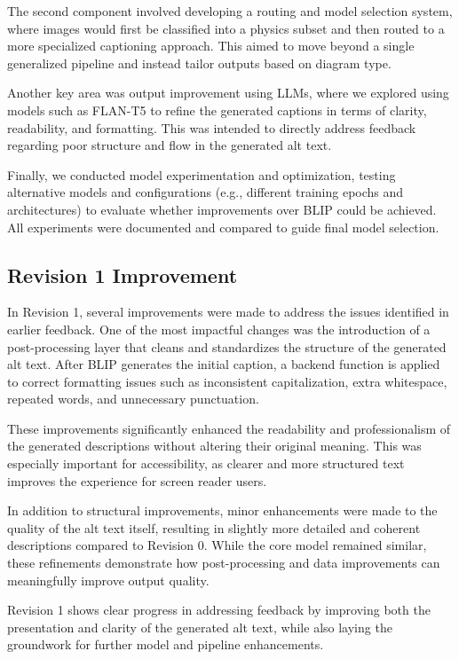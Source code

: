 \documentclass[11pt]{article}
\begin{document}
The second component involved developing a routing and model selection system, where images would first 
be classified into a physics subset and then routed to a more specialized captioning approach. This aimed to move 
beyond a single generalized pipeline and instead tailor outputs based on diagram type.

Another key area was output improvement using LLMs, where we explored using models such as FLAN-T5 to refine 
the generated captions in terms of clarity, readability, and formatting. This was intended to directly address 
feedback regarding poor structure and flow in the generated alt text.

Finally, we conducted model experimentation and optimization, testing alternative models and configurations 
(e.g., different training epochs and architectures) to evaluate whether improvements over BLIP could be achieved. All experiments were documented and compared to guide final model selection.

\subsection{Revision 1 Improvement}
In Revision 1, several improvements were made to address the issues identified in earlier feedback. One of the most impactful changes was the 
introduction of a post-processing layer that cleans and standardizes the structure of the generated alt text. After BLIP generates the initial 
caption, a backend function is applied to correct formatting issues such as inconsistent capitalization, extra whitespace, repeated words, 
and unnecessary punctuation.

These improvements significantly enhanced the readability and professionalism of the generated descriptions without altering their original meaning. 
This was especially important for accessibility, as clearer and more structured text improves the experience for screen reader users.

In addition to structural improvements, minor enhancements were made to the quality of the alt text itself, resulting in slightly more detailed 
and coherent descriptions compared to Revision 0. While the core model remained similar, these refinements demonstrate how post-processing and data 
improvements can meaningfully improve output quality.

Revision 1 shows clear progress in addressing feedback by improving both the presentation and clarity of the generated alt text, while also laying 
the groundwork for further model and pipeline enhancements.
\end{document}
